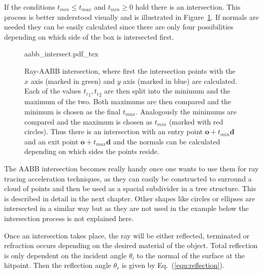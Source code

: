 \documentclass[a4paper,10pt]{article}
\renewcommand{\vec}[1]{\mathbf{#1}}
\newcommand{\equref}[1]{Eq.~(\ref{#1})}
\newcommand{\figref}[1]{Figure~\ref{#1}}
\begin{document}
    If the conditions $t_{min} \leq t_{max}$ and $t_{min} \geq 0$ hold
    there is an intersection.
    This process is better understood visually and is illustrated in 
    \figref{fig:aabb_intersect}.
    If normals are needed they can be easily calculated since there are
    only four possibilities depending on which side of the box is
    intersected first. 

    \begin{center}
        \begin{figure}
            \centering    
            \def\svgwidth{0.6\textwidth}
            {aabb_intersect.pdf_tex}
            \caption[Ray-AABB intersection]{
                Ray-AABB intersection, where first the intersection points with
                the $x$ axis (marked in green) and $y$ axis (marked in blue) are
                calculated.
                Each of the values ${t_i}_1, {t_i}_2$ are then split into the minimum
                and the maximum of the two.
                Both maximums are then compared and the minimum is chosen as the final 
                $t_{max}$.
                Analogously the minimums are compared and the maximum is chosen as
                $t_{min}$ (marked with red circles).
                Thus there is an intersection with an entry point 
                $\vec{o} + t_{min}\vec{d}$ and an exit point 
                $\vec{o} + t_{max}\vec{d}$ and the normals can be calculated depending
                on which sides the points reside.
            }
            \label{fig:aabb_intersect}
        \end{figure}
    \end{center}

    The AABB intersection becomes really handy once one wants to use them
    for ray tracing acceleration techniques, as they can easily be constructed
    to surround a cloud of points and then be used as a spacial subdivider
    in a tree structure.
    This is described in detail in the next chapter.
    Other shapes like circles or ellipses are intersected in a similar way
    but as they are not used in the example below the intersection process
    is not explained here.

    Once an intersection takes place, the ray will be either reflected, terminated
    or refraction occurs depending on the desired material of the object.
    Total reflection is only dependent on the incident angle $\theta_i$ 
    to the normal of the surface at the hitpoint.
    Then the reflection angle $\theta_r$ is given by \equref{equ:reflection}.
\end{document}
